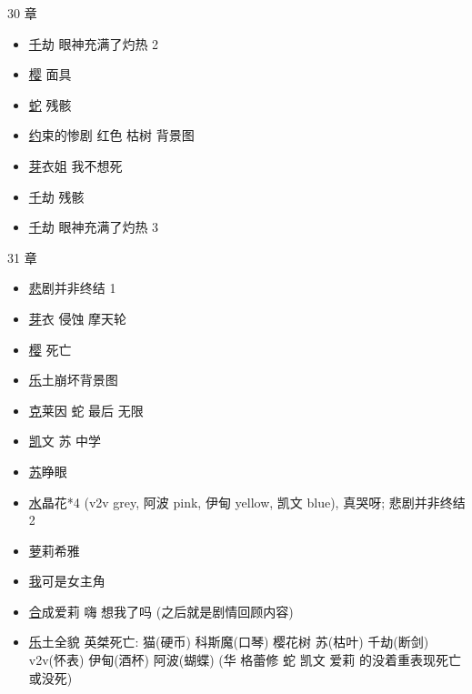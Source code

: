 \documentclass[a4paper]{article}
\begin{document}
30 章

\begin{itemize}
    \item \href{https://www.bilibili.com/video/BV1gL4y1N7Yk/?t=5370} 千劫 眼神充满了灼热 2
    \item \href{https://www.bilibili.com/video/BV1gL4y1N7Yk/?t=6000} 樱 面具
    \item \href{https://www.bilibili.com/video/BV1gL4y1N7Yk/?p=3&t=1338} 蛇 残骸
    \item \href{https://www.bilibili.com/video/BV1gL4y1N7Yk/?p=3&t=2419} 约束的惨剧 红色 枯树 背景图
    \item \href{https://www.bilibili.com/video/BV1gL4y1N7Yk/?p=3&t=3830} 芽衣姐 我不想死
    \item \href{https://www.bilibili.com/video/BV1gL4y1N7Yk/?p=5&t=1850} 千劫 残骸
    \item \href{https://www.bilibili.com/video/BV1gL4y1N7Yk/?p=5&t=3389} 千劫 眼神充满了灼热 3
\end{itemize}

31 章

\begin{itemize}
    \item \href{https://www.bilibili.com/video/BV1r94y1D7Ze/} 悲剧并非终结 1
    \item \href{https://www.bilibili.com/video/BV1r94y1D7Ze/?t=1566} 芽衣 侵蚀 摩天轮
    \item \href{https://www.bilibili.com/video/BV1r94y1D7Ze/?p=2&t=2571} 樱 死亡
    \item \href{https://www.bilibili.com/video/BV1r94y1D7Ze/?p=3&t=915} 乐土崩坏背景图
    \item \href{https://www.bilibili.com/video/BV1r94y1D7Ze/?p=4&t=1729} 克莱因 蛇 最后 无限
    \item \href{https://www.bilibili.com/video/BV1r94y1D7Ze/?p=4&t=2803} 凯文 苏 中学
    \item \href{https://www.bilibili.com/video/BV1r94y1D7Ze/?p=4&t=3865} 苏睁眼
    \item \href{https://www.bilibili.com/video/BV1r94y1D7Ze/?p=5&t=1865} 水晶花*4 (v2v grey, 阿波 pink, 伊甸 yellow, 凯文 blue), 真哭呀; 悲剧并非终结 2
    \item \href{https://www.bilibili.com/video/BV1r94y1D7Ze/?p=6&t=728} 萝莉希雅
    \item \href{https://www.bilibili.com/video/BV1r94y1D7Ze/?p=7&t=900} 我可是女主角
    \item \href{https://www.bilibili.com/video/BV1r94y1D7Ze/?p=7&t=1200} 合成爱莉 嗨 想我了吗 (之后就是剧情回顾内容)
    \item \href{https://www.bilibili.com/video/BV1r94y1D7Ze/?p=7&t=3850} 乐土全貌 英桀死亡: 猫(硬币) 科斯魔(口琴) 樱花树 苏(枯叶) 千劫(断剑) v2v(怀表) 伊甸(酒杯) 阿波(蝴蝶) (华 格蕾修 蛇 凯文 爱莉 的没着重表现死亡或没死)
\end{itemize}
\end{document}
